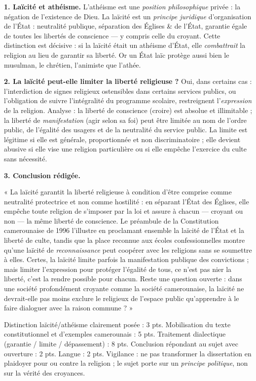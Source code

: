 \documentclass[11pt]{article}
\begin{document}
\begin{corrige}

\textbf{1. Laïcité et athéisme.} L'athéisme est une \emph{position philosophique} privée : la négation de l'existence de Dieu. La laïcité est un \emph{principe juridique} d'organisation de l'État : neutralité publique, séparation des Églises \& de l'État, garantie égale de toutes les libertés de conscience — y compris celle du croyant. Cette distinction est décisive : si la laïcité était un athéisme d'État, elle \emph{combattrait} la religion au lieu de garantir sa liberté. Or un État laïc protège aussi bien le musulman, le chrétien, l'animiste que l'athée.

\textbf{2. La laïcité peut-elle limiter la liberté religieuse ?} Oui, dans certains cas : l'interdiction de signes religieux ostensibles dans certains services publics, ou l'obligation de suivre l'intégralité du programme scolaire, restreignent l'\emph{expression} de la religion. Analyse : la liberté de conscience (croire) est absolue et illimitable ; la liberté de \emph{manifestation} (agir selon sa foi) peut être limitée au nom de l'ordre public, de l'égalité des usagers et de la neutralité du service public. La limite est légitime si elle est générale, proportionnée et non discriminatoire ; elle devient abusive si elle vise une religion particulière ou si elle empêche l'exercice du culte sans nécessité.

\textbf{3. Conclusion rédigée.}

« La laïcité garantit la liberté religieuse à condition d'être comprise comme neutralité protectrice et non comme hostilité : en séparant l'État des Églises, elle empêche toute religion de s'imposer par la loi et assure à chacun — croyant ou non — la même liberté de conscience. Le préambule de la Constitution camerounaise de 1996 l'illustre en proclamant ensemble la laïcité de l'État et la liberté de culte, tandis que la place reconnue aux écoles confessionnelles montre qu'une laïcité de \emph{reconnaissance} peut coopérer avec les religions sans se soumettre à elles. Certes, la laïcité limite parfois la manifestation publique des convictions ; mais limiter l'expression pour protéger l'égalité de tous, ce n'est pas nier la liberté, c'est la rendre possible pour chacun. Reste une question ouverte : dans une société profondément croyante comme la société camerounaise, la laïcité ne devrait-elle pas moins exclure le religieux de l'espace public qu'apprendre à le faire dialoguer avec la raison commune ? »
\end{corrige}
\begin{attention}
Distinction laïcité/athéisme clairement posée : 3 pts. Mobilisation du texte constitutionnel et d'exemples camerounais : 5 pts. Traitement dialectique (garantie / limite / dépassement) : 8 pts. Conclusion répondant au sujet avec ouverture : 2 pts. Langue : 2 pts. Vigilance : ne pas transformer la dissertation en plaidoyer pour ou contre la religion ; le sujet porte sur un \emph{principe politique}, non sur la vérité des croyances.
\end{attention}
\end{document}
